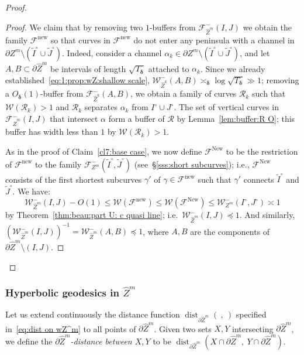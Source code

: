 \documentclass{amsart}
\newcommand{\1}{{\mathbb 1 }}
\newcommand{\Fam}{{\mathcal F}}
\newcommand{\Width}{{\mathcal W}}
\newcommand\RR{\mathcal{R}}
\newcommand{\wZ}{{\widehat Z}}
\newcommand\new{{\operatorname{new}}}
\newcommand\New{{\operatorname{New}}}
\theoremstyle{remark}
\numberwithin{equation}{section}
\theoremstyle{definition}
\newcommand{\dist}{\operatorname{dist}}
\newcommand{\bdelta}{{\boldsymbol{ \delta}}}
\begin{document}
\begin{proof}
\begin{proof}
We claim that by removing two $1$-buffers from $\Fam^-_{\wZ^m}(I,J)$ we obtain the family $\Fam^\new$ so that curves in $\Fam^\new$ do not enter any peninsula with a channel in ${\partial Z^m\setminus (\widetilde I^\circ\cup \widetilde J^\circ)}$. Indeed, consider a channel $\alpha_k\in \partial Z^m\setminus (\widetilde I^\circ \cup \widetilde J^\circ)$, and let $A,B\subset \partial \wZ^m$ be intervals of length $\sqrt{T_\bdelta}$ attached to $\alpha_k$. Since we already established~\eqref{eq:1:prop:wZ:shallow scale}, $\Width^-_{\wZ^k}(A,B)\asymp_\bdelta \log \sqrt{T_\bdelta}\gg 1$; removing a $O_\bdelta(1)$-buffer from $\Fam^-_{\wZ^k}(A,B)$, we obtain a family of curves $\RR_k$ such that $\Width(\RR_k)>1$ and $\RR_k$ separates $\alpha_k$ from $I^\circ\cup J^\circ$. The set of  vertical curves in $\Fam_{\wZ^m}^-(I,J)$ that intersect $\alpha$ form a buffer of $\RR$ by Lemma~\ref{lem:buffer:R O}; this buffer has width less than $1$ by $\Width(\RR_k)>1$.

 As in the proof of Claim~\ref{cl7:base case}, we now define $\Fam^\New$ to be the restriction of $\Fam^\new$ to the family $\Fam^-_{Z^m}(\widetilde I^\circ,\widetilde J^\circ)$ (see~\S\ref{sss:short subcurves}); i.e., $\Fam^\New$ consists of the first shortest subcurves $\gamma'$ of $\gamma\in \Fam^\new$ such that $\gamma'$ connects $\widetilde I^\circ$ and $\widetilde J^\circ$. We have:
\[\Width^-_{\wZ^m}(I,J)-O(1)\le \Width(\Fam^\new) \le \Width(\Fam^\New)\le \Width^-_{Z^m}(I^\circ,J^\circ ) \asymp 1 \]
 by Theorem~\ref{thm:beau:part U: c quasi line}; i.e.~$\Width^-_{\wZ^m}(I,J)\preceq 1$.  And similarly, $\left(\Width^-_{\wZ^m}(I,J)\right)^{-1}= \Width^-_{\wZ^m}(A,B)\preceq 1$, where $A,B$ are the components of $\partial \wZ^m\setminus (I,J)$.
\end{proof}
\end{proof}


\subsubsection{Hyperbolic geodesics in $\wZ^m$} Let us extend continuously the distance function $\dist_{\partial \wZ^m}(\ ,\ )$ specified in~\eqref{eq:dist on wZ^m} to all points of $\partial \wZ^m$. Given two sets $X,Y$ intersecting $\partial \wZ^m$, we define the \emph{$\partial \wZ^m$-distance between $X,Y$} to be $\dist_{\partial \wZ^m}\left(X\cap \partial \wZ^m,\ Y\cap \partial \wZ^m \right)$. 
\end{document}
